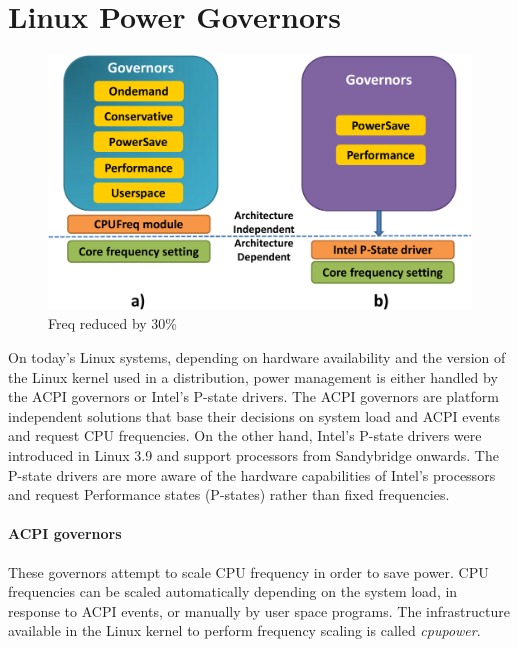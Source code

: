\section{Linux Power Governors}\label{sec:linux-powergov}

\begin{figure}[h]
  \begin{center}
\includegraphics[width=\linewidth]{figs/gov-crop.pdf}
  \end{center}
  \vspace{-0.1in}
  \caption{Freq reduced by 30\%}
	\label{fig:gov}
\end{figure}
\fi

On today's Linux systems, depending on hardware availability and the version of the Linux kernel used in a distribution, power management 
is either handled by the ACPI governors or Intel's P-state drivers. The ACPI governors are platform independent solutions that base their decisions 
on system load and ACPI events and request CPU frequencies. On the other hand, Intel's P-state drivers were introduced in Linux 3.9 and support processors from Sandybridge onwards. 
The P-state drivers are more aware of the hardware capabilities of Intel's processors and request Performance states (P-states) rather than fixed frequencies.

\paragraph{ACPI governors}
These governors attempt to scale CPU frequency in order to save power. CPU frequencies can be scaled automatically 
depending on the system load, in response to ACPI events, or manually by user space programs. The infrastructure available in the Linux kernel to perform 
frequency scaling is called \emph{cpupower}.  

